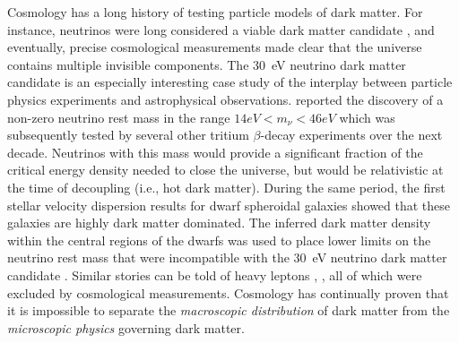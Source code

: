 \documentclass[modern,linenumbers]{aastex62}
\newcommand{\Comment}[3]{\textcolor{#1}{(#2: #3)}}
\newcommand{\KB}[1]{\Comment{orange}{KB}{#1}} %
\begin{document}
Cosmology has a long history of testing particle models of dark matter.
For instance, neutrinos were long considered a viable dark matter candidate \citep[\eg,][]{Kolb:1988}, and eventually, precise cosmological measurements made clear that the universe contains multiple invisible components.
The 30~eV neutrino dark matter candidate is an especially interesting case study of the interplay between particle physics experiments and astrophysical observations.
\citet{Lyubimov:1980un} reported the discovery of a non-zero neutrino rest mass in the range $14 \unit{eV} < m_{\nu} < 46 \unit{eV}$ which was subsequently tested by several other tritium $\beta$-decay experiments over the next decade.
Neutrinos with this mass would provide a significant fraction of the critical energy density needed to close the universe, but would be relativistic at the time of decoupling (i.e., hot dark matter).
During the same period, the first stellar velocity dispersion results for dwarf spheroidal galaxies showed that these galaxies are highly dark matter dominated.
The inferred dark matter density within the central regions of the dwarfs
was used to place lower limits on the neutrino rest mass that were incompatible with the 30~eV neutrino dark matter candidate \citep{Aaronson:1983,Gerhard:1992}.
Similar stories can be told of heavy leptons \citep{Gunn:1978}, , all of which were excluded by cosmological measurements.
Cosmology has continually proven that it is impossible to separate the \emph{macroscopic distribution} of dark matter from the \emph{microscopic physics} governing dark matter.

\end{document}
